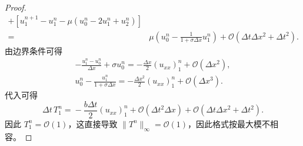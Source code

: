 \begin{proof}
\begin{align*}
        + \left[
        u_1^{n+1} - u_1^n - \mu(u_0^n - 2 u_1^n + u_2^n)
        \right]                                                                                                    \\
        ={}                    & \mu \left(u_0^n - \frac{1}{1+\sigma \Delta x} u_1^n\right)
        + \mathcal{O}(\Delta t \Delta x^2 + \Delta t^2).
    \end{align*}
    由边界条件可得
    \begin{gather*}
        -  \frac{u_1^n - u_0^n}{\Delta x} + \sigma u_0^n = -\frac{\Delta x}2 (u_{xx})_1^n + \mathcal{O}(\Delta x^2),\\
        u_0^n - \frac{u_1^n}{1+\sigma \Delta x} = -\frac{\Delta x^2}2 (u_{xx})_1^n + \mathcal{O}(\Delta x^3).
    \end{gather*}
    代入可得
    \[
        \Delta t\, T_1^{n} ={} -\frac{b \Delta t}2 (u_{xx})_1^n + \mathcal{O}(\Delta t^2 \Delta x)+ \mathcal{O}(\Delta t \Delta x^2 + \Delta t^2).
    \]
    因此 $T_1^n = \mathcal{O}(1)$，这直接导致 $\|T^n\|_{\infty} = \mathcal{O}(1)$，因此格式按最大模不相容。
\end{proof}

